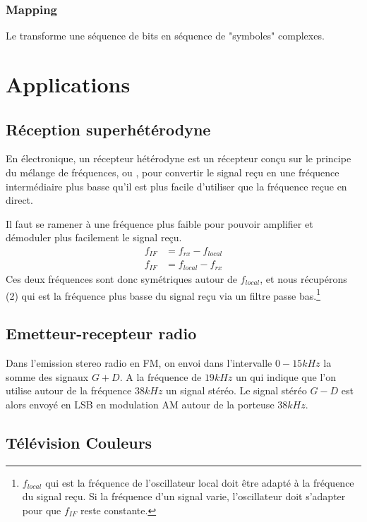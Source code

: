 \subsection{Mapping}

Le  transforme une séquence de bits en séquence de "symboles" complexes.

\chapter{Applications}

\section{Réception superhétérodyne}

En électronique, un récepteur hétérodyne est un récepteur conçu sur le principe du mélange de fréquences, ou , pour convertir le signal reçu en une fréquence intermédiaire plus basse qu'il est plus facile d'utiliser que la fréquence reçue en direct.

Il faut se ramener à une fréquence plus faible pour pouvoir amplifier et démoduler plus facilement le signal reçu.
\begin{align*}
    f_{IF} &= f_{rx} - f_{local}\\
    f_{IF} &= f_{local} - f_{rx}
\end{align*}
Ces deux fréquences sont donc symétriques autour de $f_{local}$, et nous récupérons (2) qui est la fréquence plus basse du signal reçu via un filtre passe bas.\footnote{$f_{local}$ qui est la fréquence de l'oscillateur local doit être adapté à la fréquence du signal reçu. Si la fréquence d'un signal varie, l'oscillateur doit s'adapter pour que $f_{IF}$ reste constante.}

\section{Emetteur-recepteur radio}

Dans l'emission stereo radio en FM, on envoi dans l'intervalle $0-15 kHz$ la somme des signaux $G+D$. A la fréquence de $19kHz$ un  qui indique que l'on utilise autour de la fréquence $38 kHz$ un signal stéréo. Le signal stéréo $G-D$ est alors envoyé en LSB en modulation AM autour de la porteuse $38kHz$.

\section{Télévision Couleurs}

